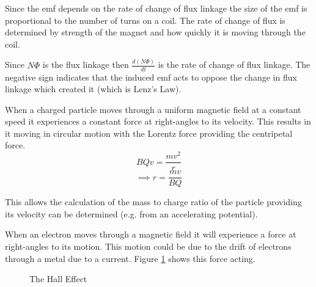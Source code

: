\documentclass[main.tex]{subfiles}
\begin{document}

Since the emf depends on the rate of change of flux linkage the size of the emf is proportional to the number of turns on a coil. The rate of change of flux is determined by strength of the magnet and how quickly it is moving through the coil.


Since $N\Phi$ is the flux linkage then $\frac{d(N\Phi)}{dt}$ is the rate of change of flux linkage. The negative sign indicates that the induced emf acts to oppose the change in flux linkage which created it (which is Lenz's Law).


When a charged particle moves through a uniform magnetic field at a constant speed it experiences a constant force at right-angles to its velocity. This results in it moving in circular motion with the Lorentz force providing the centripetal force.
\[ BQv = \frac{mv^2}{r} \]
\[\implies r = \frac{mv}{BQ} \]

This allows the calculation of the mass to charge ratio of the particle providing its velocity can be determined (e.g. from an accelerating potential).


When an electron moves through a magnetic field it will experience a force at right-angles to its motion. This motion could be due to the drift of electrons through a metal due to a current. Figure \ref{halleffect} shows this force acting.

\begin{figure}[h]
  \begin{center}
  \end{center}
  \caption{The Hall Effect}
  \label{halleffect}
\end{figure}
\end{document}
